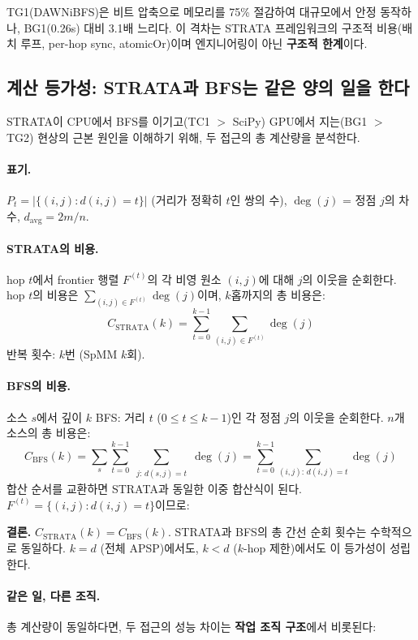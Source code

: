 \documentclass[11pt,a4paper]{article}
\begin{document}
TG1(DAWNiBFS)은 비트 압축으로 메모리를 75\% 절감하여 대규모에서 안정 동작하나, BG1(0.26s) 대비 3.1배 느리다. 이 격차는 STRATA 프레임워크의 구조적 비용(배치 루프, per-hop sync, atomicOr)이며 엔지니어링이 아닌 \textbf{구조적 한계}이다.

\subsection{계산 등가성: STRATA과 BFS는 같은 양의 일을 한다}

STRATA이 CPU에서 BFS를 이기고(TC1 $>$ SciPy) GPU에서 지는(BG1 $>$ TG2) 현상의 근본 원인을 이해하기 위해, 두 접근의 총 계산량을 분석한다.

\paragraph{표기.}
$P_t = |\{(i,j) : d(i,j) = t\}|$ (거리가 정확히 $t$인 쌍의 수), $\deg(j)$ = 정점 $j$의 차수, $d_{\text{avg}} = 2m/n$.

\paragraph{STRATA의 비용.}
hop $t$에서 frontier 행렬 $F^{(t)}$의 각 비영 원소 $(i,j)$에 대해 $j$의 이웃을 순회한다. hop $t$의 비용은 $\sum_{(i,j) \in F^{(t)}} \deg(j)$이며, $k$홉까지의 총 비용은:
\[
C_{\text{STRATA}}(k) = \sum_{t=0}^{k-1} \sum_{(i,j) \in F^{(t)}} \deg(j)
\]
반복 횟수: $k$번 (SpMM $k$회).

\paragraph{BFS의 비용.}
소스 $s$에서 깊이 $k$ BFS: 거리 $t$ ($0 \leq t \leq k{-}1$)인 각 정점 $j$의 이웃을 순회한다. $n$개 소스의 총 비용은:
\[
C_{\text{BFS}}(k) = \sum_s \sum_{t=0}^{k-1} \sum_{\substack{j:\, d(s,j)=t}} \deg(j) = \sum_{t=0}^{k-1} \sum_{(i,j):\, d(i,j)=t} \deg(j)
\]
합산 순서를 교환하면 STRATA과 동일한 이중 합산식이 된다. $F^{(t)} = \{(i,j) : d(i,j) = t\}$이므로:

\begin{keypoint}[결론]
\textbf{결론.} $C_{\text{STRATA}}(k) = C_{\text{BFS}}(k)$. STRATA과 BFS의 총 간선 순회 횟수는 수학적으로 동일하다. $k = d$ (전체 APSP)에서도, $k < d$ ($k$-hop 제한)에서도 이 등가성이 성립한다.
\end{keypoint}

\paragraph{같은 일, 다른 조직.}
총 계산량이 동일하다면, 두 접근의 성능 차이는 \textbf{작업 조직 구조}에서 비롯된다:
\end{document}
